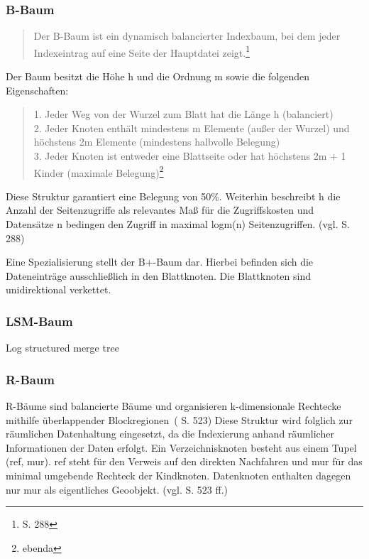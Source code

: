 \subsubsection{B-Baum}

\begin{quote}
Der B-Baum ist ein dynamisch balancierter Indexbaum, bei dem jeder Indexeintrag auf eine Seite der Hauptdatei zeigt.\footnote{\cite{book:kudrass} S. 288}
\end{quote}
Der Baum besitzt die Höhe h und die Ordnung m sowie die folgenden Eigenschaften:
\begin{quote}
1. Jeder Weg von der Wurzel zum Blatt hat die Länge h (balanciert)\\
2. Jeder Knoten enthält mindestens m Elemente (außer der Wurzel) und  höchstens 2m Elemente (mindestens halbvolle Belegung)\\
3. Jeder Knoten ist entweder eine Blattseite oder hat höchstens 2m + 1 Kinder (maximale Belegung)\footnote{ebenda}
\end{quote}
Diese Struktur garantiert eine Belegung von 50\%.
Weiterhin beschreibt h die Anzahl der Seitenzugriffe als relevantes Maß für die Zugriffskosten und Datensätze n bedingen den Zugriff in maximal logm(n) Seitenzugriffen. (vgl. \cite{book:kudrass} S. 288)

Eine Spezialisierung stellt der B+-Baum dar.
Hierbei befinden sich die Dateneinträge ausschließlich in den Blattknoten.
Die Blattknoten sind unidirektional verkettet.

\subsubsection{LSM-Baum}
Log structured merge tree

\subsubsection{R-Baum}
R-Bäume sind balancierte Bäume und \glqq organisieren k-dimensionale Rechtecke mithilfe überlappender Blockregionen\grqq \ (\cite{book:kudrass} S. 523)
Diese Struktur wird folglich zur räumlichen Datenhaltung eingesetzt, da die Indexierung anhand räumlicher Informationen der Daten erfolgt.
Ein Verzeichnisknoten besteht aus einem Tupel (ref, mur).
ref steht für den Verweis auf den direkten Nachfahren und mur für das minimal umgebende Rechteck der Kindknoten.
Datenknoten enthalten dagegen nur mur als eigentliches Geoobjekt. (vgl. \cite{book:kudrass} S. 523 ff.)

